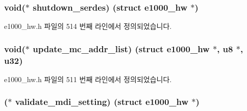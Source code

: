 \subsubsection[{\texorpdfstring{shutdown\+\_\+serdes}{shutdown_serdes}}]{\setlength{\rightskip}{0pt plus 5cm}void($\ast$ shutdown\+\_\+serdes) (struct {\bf e1000\+\_\+hw} $\ast$)}\hypertarget{structe1000__mac__operations_a13efb3290c2c9a895f5acdc3f8db8646}{}\label{structe1000__mac__operations_a13efb3290c2c9a895f5acdc3f8db8646}


e1000\+\_\+hw.\+h 파일의 514 번째 라인에서 정의되었습니다.

\subsubsection[{\texorpdfstring{update\+\_\+mc\+\_\+addr\+\_\+list}{update_mc_addr_list}}]{\setlength{\rightskip}{0pt plus 5cm}void($\ast$ update\+\_\+mc\+\_\+addr\+\_\+list) (struct {\bf e1000\+\_\+hw} $\ast$, {\bf u8} $\ast$, {\bf u32})}\hypertarget{structe1000__mac__operations_a7da80f37f7dab7ae01648393f3d200c2}{}\label{structe1000__mac__operations_a7da80f37f7dab7ae01648393f3d200c2}


e1000\+\_\+hw.\+h 파일의 511 번째 라인에서 정의되었습니다.

\subsubsection[{\texorpdfstring{validate\+\_\+mdi\+\_\+setting}{validate_mdi_setting}}]{($\ast$ validate\+\_\+mdi\+\_\+setting) (struct {\bf e1000\+\_\+hw} $\ast$)}\hypertarget{structe1000__mac__operations_a4bca6f84560fe49d7f20810deeed3aa0}{}\label{structe1000__mac__operations_a4bca6f84560fe49d7f20810deeed3aa0}


